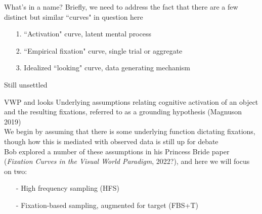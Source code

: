 \documentclass{beamer}
\begin{document}
%
%
%
%


\begin{frame}{What's in a name?}
Briefly, we need to address the fact that there are a few distinct but similar ``curves" in question here \newline \\

\begin{itemize}
  \item[1.] ``Activation" curve, latent mental process
  \item[2.] ``Empirical fixation" curve, single trial or aggregate
  \item[3.] Idealized ``looking" curve, data generating mechanism
\end{itemize}

\vspace{4mm}

Still unsettled
\end{frame}

\begin{frame}{VWP and looks}
Underlying assumptions relating cognitive activation of an object and the resulting fixations, referred to as a grounding hypothesis (Magnuson 2019) \newline \\

We begin by assuming that there is some underlying function dictating fixations, though how this is mediated with observed data is still up for debate \newline \\

Bob explored a number of these assumptions in his Princess Bride paper (\textit{Fixation Curves in the Visual World Paradigm}, 2022?), and here we will focus on two: 
\begin{itemize}
  \item[-] High frequency sampling (HFS)
  \item[-] Fixation-based sampling, augmented for target (FBS+T)
\end{itemize}

\end{frame}
\end{document}

